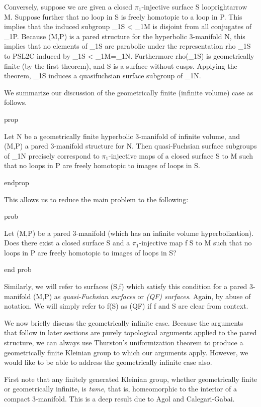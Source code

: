 Conversely, suppose we are given a closed $\pi_1$-injective surface
S looprightarrow M.  Suppose further that no loop in S is freely homotopic to
a loop in P. This implies that the induced subgroup \pi_1S < \pi_1M is disjoint
from all conjugates of \pi_1P. Because (M,P) is a pared structure for the
hyperbolic 3-manifold N, this implies that no elements of \pi_1S are parabolic
under the representation rho \colon \pi_1S to PSL2C induced by \pi_1S < \pi_1M=\pi_1N.
Furthermore rho(\pi_1S) is geometrically finite (by the first theorem), and S is
a surface without cusps.  Applying the theorem, \pi_1S induces a quasifuchsian
surface subgroup of \pi_1N.

We summarize our discussion of the geometrically finite (infinite volume) case
as follows.

prop

Let N be a geometrically finite hyperbolic 3-manifold of infinite volume, and
(M,P) a pared 3-manifold structure for N. Then quasi-Fuchsian surface subgroups
of \pi_1N precisely correspond to $\pi_1$-injective maps of a closed surface S to
M such that no loops in P are freely homotopic to images of loops in S.

endprop

This allows us to reduce the main problem to the following:

prob

Let (M,P) be a pared 3-manifold (which has an infinite volume hyperbolization).
Does there exist a closed surface S and a $\pi_1$-injective map f \colon S to M such
that no loops in P are freely homotopic to images of loops in S?

end prob

Similarly, we will refer to surfaces (S,f) which satisfy this condition for
a pared 3-manifold (M,P) as \emph{quasi-Fuchsian surfaces} or \emph{(QF)
surfaces}.  Again, by abuse of notation. We will simply refer to f(S) as (QF)
if f and S are clear from context.

We now briefly discuss the geometrically infinite case. Because the arguments
that follow in later sections are purely topological arguments applied to the
pared structure, we can always use Thurston's uniformization theorem to produce
a geometrically finite Kleinian group to which our arguments apply. However, we
would like to be able to address the geometrically infinite case also.

First note that any finitely generated Kleinian group, whether geometrically
finite or geometrically infinite, is \emph{tame}, that is, homeomorphic to the
interior of a compact 3-manifold. This is a deep result due to Agol and
Calegari-Gabai.

